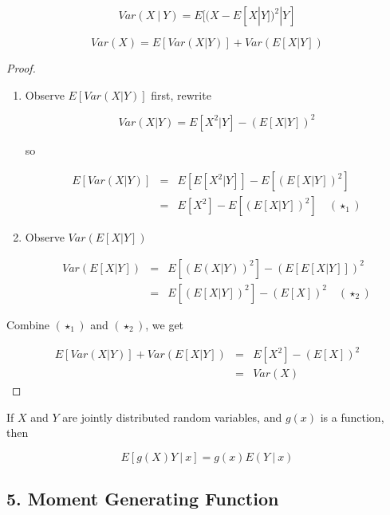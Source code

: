 \begin{defn}

$$Var(X~|~Y) = E[(X - E[X|Y])^2|Y]$$
	
\end{defn}

\begin{prop*}
	$$Var(X) = E[Var(X|Y)] + Var(E[X|Y])$$
\end{prop*}

\begin{proof}$ $
	\begin{enumerate}
		\item Observe $E[Var(X|Y)]$ first, rewrite 
		
		$$Var(X|Y) = E[X^2 | Y] - (E[X|Y])^2$$
		
		so 
		
		\begin{eqnarray*}
			E[Var(X|Y)] &=& E[E[X^2|Y]] - E[(E[X|Y])^2] \\
			&=& E[X^2] - E[(E[X|Y])^2] \quad(\star_1)
		\end{eqnarray*}
		\item Observe $Var(E[X|Y])$
		
		\begin{eqnarray*}
			Var(E[X|Y]) &=& E[(E(X|Y))^2] - (E[E[X|Y]])^2\\
			&=& E[(E[X|Y])^2] - (E[X])^2 \quad(\star_2)
		\end{eqnarray*}
		
	\end{enumerate}
	
	Combine $(\star_1)$ and $(\star_2)$, we get
	
	\begin{eqnarray*}
		E[Var(X|Y)] + Var(E[X|Y]) &=& E[X^2] - (E[X])^2\\
		&=& Var(X)
	\end{eqnarray*}
\end{proof}

\begin{thm*}
	If $X$ and $Y$ are jointly distributed random variables, and $g(x)$ is a function, then
	
	$$E[g(X)Y~|~x] = g(x)E(Y~|~x)$$
\end{thm*}



\newpage

\subsection*{5. Moment Generating Function}

